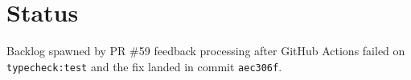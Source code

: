 \section{Status}\label{record-405-status}

Backlog spawned by PR \#59 feedback processing after GitHub Actions failed on \texttt{t\allowbreak{}y\allowbreak{}p\allowbreak{}e\allowbreak{}c\allowbreak{}h\allowbreak{}e\allowbreak{}c\allowbreak{}k\allowbreak{}:\allowbreak{}t\allowbreak{}e\allowbreak{}s\allowbreak{}t} and the fix landed in commit \texttt{a\allowbreak{}e\allowbreak{}c\allowbreak{}3\allowbreak{}0\allowbreak{}6\allowbreak{}f}.

